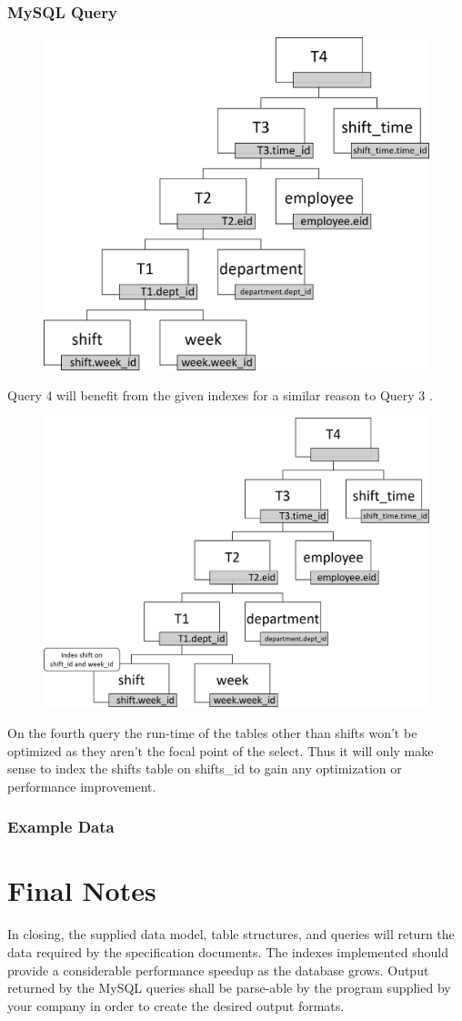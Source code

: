 \documentclass[letter,12pt]{texMemo}
\begin{document}
\subsubsection*{MySQL Query}
	
\begin{figure}[H]
	\centering
	\includegraphics[width=.5\textwidth]{query4.png}
\end{figure}
Query 4 will benefit from the given indexes for a similar reason to Query 3
.\begin{figure}[H]
	\centering
	\includegraphics[width=.5\textwidth]{query4_indexed.png}
\end{figure}
On the fourth query the run-time of the tables other than shifts won't be optimized as they aren't the focal point of the select. Thus it will only make sense to index the shifts table on shifts\_id to gain any optimization or performance improvement.  
\vspace{1em}
\subsubsection*{Example Data}
\begin{changemargin}{-1.25cm}{-1.25cm}
	\begin{center}
		
	\end{center}
\end{changemargin}

\section*{Final Notes}
In closing, the supplied data model, table structures, and queries will return the data required by the specification documents. The indexes implemented should provide a considerable performance speedup as the database grows. Output returned by the MySQL queries shall be parse-able by the program supplied by your company in order to create the desired output formats.
\end{document}
